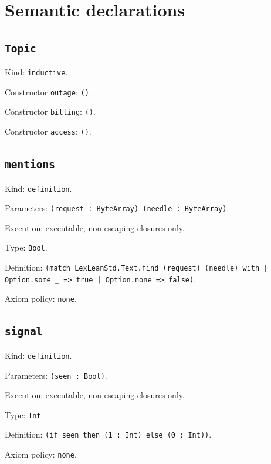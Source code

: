 \documentclass[11pt]{article}
\begin{document}
\section*{Semantic declarations}
\subsection*{\texttt{Topic}}
\noindent Kind: \texttt{inductive}.\par
\noindent Constructor \texttt{outage}: \texttt{()}.\par
\noindent Constructor \texttt{billing}: \texttt{()}.\par
\noindent Constructor \texttt{access}: \texttt{()}.\par
\subsection*{\texttt{mentions}}
\noindent Kind: \texttt{definition}.\par
\noindent Parameters: \texttt{(request : ByteArray) (needle : ByteArray)}.\par
\noindent Execution: executable, non-escaping closures only.\par
\noindent Type: \texttt{Bool}.\par
\noindent Definition: \texttt{(match LexLeanStd.Text.find (request) (needle) with | Option.some \_ => true | Option.none => false)}.\par
\noindent Axiom policy: \texttt{none}.\par
\subsection*{\texttt{signal}}
\noindent Kind: \texttt{definition}.\par
\noindent Parameters: \texttt{(seen : Bool)}.\par
\noindent Execution: executable, non-escaping closures only.\par
\noindent Type: \texttt{Int}.\par
\noindent Definition: \texttt{(if seen then (1 : Int) else (0 : Int))}.\par
\noindent Axiom policy: \texttt{none}.\par
\end{document}
